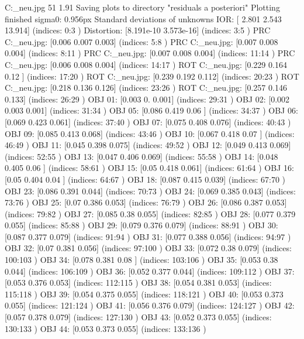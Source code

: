 C:\Users\Clemens\Desktop\fotos_neu\3.jpg	51	1.91
Saving plots to directory "residuals a posteriori"
Plotting finished
sigma0: 0.956px
Standard deviations of unknowns
IOR: [ 2.801  2.543 13.914] (indices: 0:3 )
Distortion: [8.191e-10 3.573e-16] (indices: 3:5 )
PRC C:\Users\Clemens\Desktop\fotos_neu\1.jpg: [0.006 0.007 0.003] (indices: 5:8 )
PRC C:\Users\Clemens\Desktop\fotos_neu\2.jpg: [0.007 0.008 0.004] (indices: 8:11 )
PRC C:\Users\Clemens\Desktop\fotos_neu\3.jpg: [0.007 0.008 0.004] (indices: 11:14 )
PRC C:\Users\Clemens\Desktop\fotos_neu\4.jpg: [0.006 0.008 0.004] (indices: 14:17 )
ROT C:\Users\Clemens\Desktop\fotos_neu\1.jpg: [0.229 0.164 0.12 ] (indices: 17:20 )
ROT C:\Users\Clemens\Desktop\fotos_neu\2.jpg: [0.239 0.192 0.112] (indices: 20:23 )
ROT C:\Users\Clemens\Desktop\fotos_neu\3.jpg: [0.218 0.136 0.126] (indices: 23:26 )
ROT C:\Users\Clemens\Desktop\fotos_neu\4.jpg: [0.257 0.146 0.133] (indices: 26:29 )
OBJ 01: [0.003 0.    0.001] (indices: 29:31 )
OBJ 02: [0.002 0.003 0.001] (indices: 31:34 )
OBJ 05: [0.086 0.419 0.06 ] (indices: 34:37 )
OBJ 06: [0.069 0.423 0.061] (indices: 37:40 )
OBJ 07: [0.075 0.408 0.076] (indices: 40:43 )
OBJ 09: [0.085 0.413 0.068] (indices: 43:46 )
OBJ 10: [0.067 0.418 0.07 ] (indices: 46:49 )
OBJ 11: [0.045 0.398 0.075] (indices: 49:52 )
OBJ 12: [0.049 0.413 0.069] (indices: 52:55 )
OBJ 13: [0.047 0.406 0.069] (indices: 55:58 )
OBJ 14: [0.048 0.405 0.06 ] (indices: 58:61 )
OBJ 15: [0.05  0.418 0.061] (indices: 61:64 )
OBJ 16: [0.05  0.404 0.04 ] (indices: 64:67 )
OBJ 18: [0.087 0.415 0.039] (indices: 67:70 )
OBJ 23: [0.086 0.391 0.044] (indices: 70:73 )
OBJ 24: [0.069 0.385 0.043] (indices: 73:76 )
OBJ 25: [0.07  0.386 0.053] (indices: 76:79 )
OBJ 26: [0.086 0.387 0.053] (indices: 79:82 )
OBJ 27: [0.085 0.38  0.055] (indices: 82:85 )
OBJ 28: [0.077 0.379 0.055] (indices: 85:88 )
OBJ 29: [0.079 0.376 0.079] (indices: 88:91 )
OBJ 30: [0.087 0.377 0.079] (indices: 91:94 )
OBJ 31: [0.077 0.388 0.056] (indices: 94:97 )
OBJ 32: [0.07  0.381 0.056] (indices: 97:100 )
OBJ 33: [0.072 0.38  0.079] (indices: 100:103 )
OBJ 34: [0.078 0.381 0.08 ] (indices: 103:106 )
OBJ 35: [0.053 0.38  0.044] (indices: 106:109 )
OBJ 36: [0.052 0.377 0.044] (indices: 109:112 )
OBJ 37: [0.053 0.376 0.053] (indices: 112:115 )
OBJ 38: [0.054 0.381 0.053] (indices: 115:118 )
OBJ 39: [0.054 0.375 0.055] (indices: 118:121 )
OBJ 40: [0.053 0.373 0.055] (indices: 121:124 )
OBJ 41: [0.056 0.376 0.079] (indices: 124:127 )
OBJ 42: [0.057 0.378 0.079] (indices: 127:130 )
OBJ 43: [0.052 0.373 0.055] (indices: 130:133 )
OBJ 44: [0.053 0.373 0.055] (indices: 133:136 )
